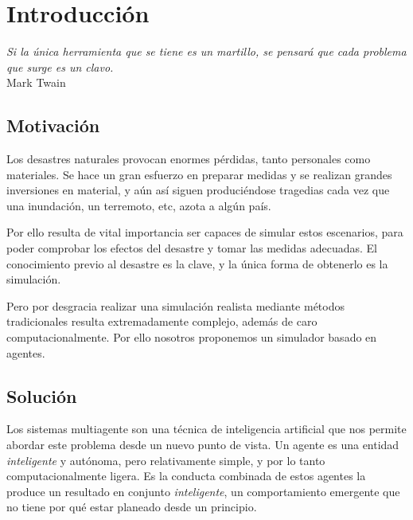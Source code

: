 
\chapter*{Introducción} \label{cap0}


\begin{flushright}
\begin{minipage}{7.85cm}
    {\em Si la única herramienta que se tiene es un martillo, se pensará que
    cada problema que surge es un clavo.} \\  Mark Twain
\end{minipage}
\end{flushright}

\vspace*{5mm}

\section*{Motivación}

Los desastres naturales provocan enormes pérdidas, tanto personales como
materiales. Se hace un gran esfuerzo en preparar medidas y se realizan grandes
inversiones en material, y aún así siguen produciéndose tragedias cada vez que
una inundación, un terremoto, etc, azota a algún país.

Por ello resulta de vital importancia ser capaces de simular estos escenarios,
para poder comprobar los efectos del desastre y tomar las medidas adecuadas. El
conocimiento previo al desastre es la clave, y la única forma de obtenerlo es
la simulación.

Pero por desgracia realizar una simulación realista mediante métodos
tradicionales resulta extremadamente complejo, además de caro
computacionalmente. Por ello nosotros proponemos un simulador basado en agentes.

\section*{Solución}

Los sistemas multiagente son una técnica de inteligencia artificial que nos
permite abordar este problema desde un nuevo punto de vista. Un agente es una
entidad {\em inteligente} y autónoma, pero relativamente simple, y por lo tanto
computacionalmente ligera. Es la conducta combinada de estos agentes la produce
un resultado en conjunto {\em inteligente}, un comportamiento emergente que no
tiene por qué estar planeado desde un principio.

